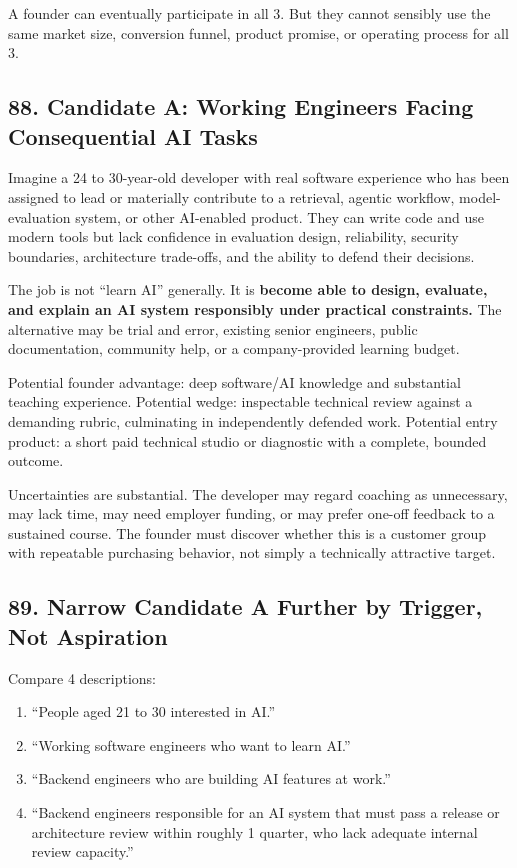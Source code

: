 A founder can eventually participate in all 3. But they cannot sensibly use the same market size, conversion funnel, product promise, or operating process for all 3.

\subsection*{88. Candidate A: Working Engineers Facing Consequential AI Tasks}

Imagine a 24 to 30-year-old developer with real software experience who has been assigned to lead or materially contribute to a retrieval, agentic workflow, model-evaluation system, or other AI-enabled product. They can write code and use modern tools but lack confidence in evaluation design, reliability, security boundaries, architecture trade-offs, and the ability to defend their decisions.

The job is not ``learn AI'' generally. It is \textbf{become able to design, evaluate, and explain an AI system responsibly under practical constraints.} The alternative may be trial and error, existing senior engineers, public documentation, community help, or a company-provided learning budget.

Potential founder advantage: deep software/AI knowledge and substantial teaching experience. Potential wedge: inspectable technical review against a demanding rubric, culminating in independently defended work. Potential entry product: a short paid technical studio or diagnostic with a complete, bounded outcome.

Uncertainties are substantial. The developer may regard coaching as unnecessary, may lack time, may need employer funding, or may prefer one-off feedback to a sustained course. The founder must discover whether this is a customer group with repeatable purchasing behavior, not simply a technically attractive target.

\subsection*{89. Narrow Candidate A Further by Trigger, Not Aspiration}

Compare 4 descriptions:

\begin{enumerate}
    \item ``People aged 21 to 30 interested in AI.''
    \item ``Working software engineers who want to learn AI.''
    \item ``Backend engineers who are building AI features at work.''
    \item ``Backend engineers responsible for an AI system that must pass a release or architecture review within roughly 1 quarter, who lack adequate internal review capacity.''
\end{enumerate}

